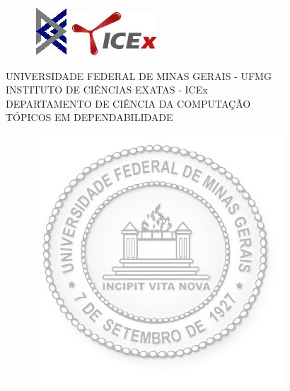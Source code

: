\documentclass[a4paper,12pt]{report}
\begin{document}
	\begin{titlepage}

		\begin{center}
			\begin{figure}[htb]
			\begin{center}

\noindent\hspace*{-.12cm}\includegraphics[scale=.6]{Figuras/dcc.jpg}
				\noindent\hspace*{12.3 cm}\includegraphics[scale
= 0.6]{Figuras/icex.jpg}
			\end{center}
			\end{figure}

		\vspace*{-2.45cm}

		\large{
			\hspace{-.5cm}UNIVERSIDADE FEDERAL DE MINAS GERAIS -
UFMG\\
			\hspace{-.5cm}INSTITUTO DE CIÊNCIAS EXATAS - ICEx\\
			\hspace{-1cm}DEPARTAMENTO DE CIÊNCIA DA COMPUTAÇÃO \\

			\hspace{-.5cm}TÓPICOS EM DEPENDABILIDADE
		}

		\vspace{4cm}

		\begin{figure}[htb]
			\begin{center}

\includegraphics[scale=0.5]{Figuras/UFMGdagua.jpg}
			\end{center}
		\end{figure}


\end{center}
\end{titlepage}
\end{document}
